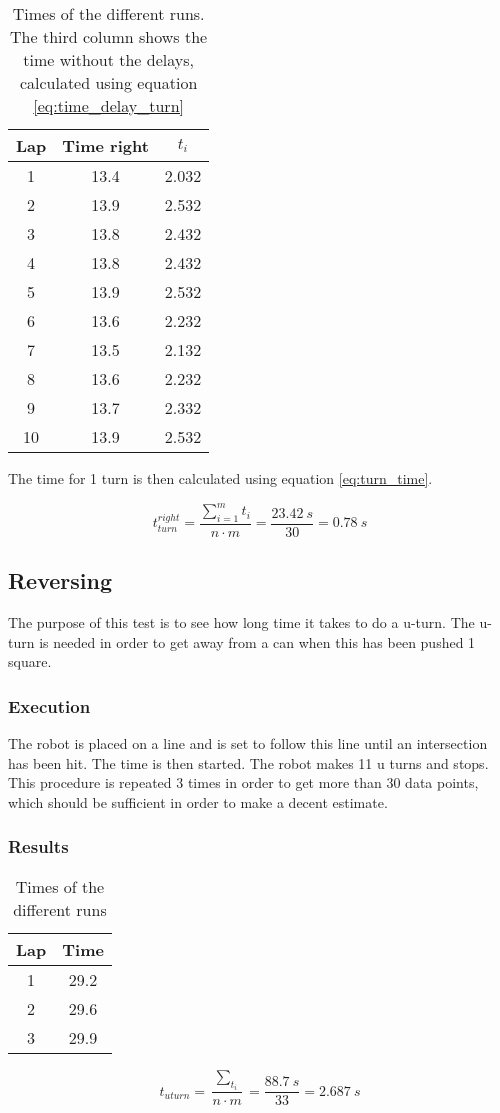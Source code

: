 \begin{table} [H]
\centering
 \begin{tabular}{|c|c|c|}
  \hline Lap & Time right & $t_i$ \\ \hline
  1  & 13.4  & 2.032 \\  \hline
  2  & 13.9  & 2.532 \\  \hline
  3  & 13.8  & 2.432 \\  \hline
  4  & 13.8  & 2.432 \\  \hline
  5  & 13.9  & 2.532 \\  \hline
  6  & 13.6  & 2.232 \\  \hline
  7  & 13.5  & 2.132 \\  \hline
  8  & 13.6  & 2.232 \\  \hline
  9  & 13.7  & 2.332 \\  \hline
  10 & 13.9  & 2.532 \\ \hline
 \end{tabular}
 \caption{Times of the different runs. The third column shows the time without the delays, calculated using equation \ref{eq:time_delay_turn}}
 \label{tab:time_right}
\end{table}

The time for 1 turn is then calculated using equation \ref{eq:turn_time}.

$$
t_{turn}^{right} = \frac{\sum^{m}_{i=1}t_i}{n\cdot m} = \frac{23.42\ s}{30} = 0.78\ s
$$

\subsection{Reversing}
The purpose of this test is to see how long time it takes to do a u-turn. The u-turn is needed in order to get away from a can when this has been pushed 1 square.

\subsubsection{Execution}
The robot is placed on a line and is set to follow this line until an intersection has been hit. The time is then started. The robot makes 11 u turns and stops. This procedure is repeated 3 times in order to get more than 30 data points, which should be sufficient in order to make a decent estimate.

\subsubsection{Results}

\begin{table} [H]
\centering
 \begin{tabular}{|c|c|}
  \hline Lap & Time \\ \hline
  1  & 29.2  \\  \hline
  2  & 29.6  \\  \hline
  3  & 29.9  \\  \hline
 \end{tabular}
 \caption{Times of the different runs}
 \label{tab:time_uturn}
\end{table}

$$
t_{uturn} = \frac{\sum_{t_i}}{n\cdot m} = \frac{88.7\ s}{33} = 2.687\ s
$$
